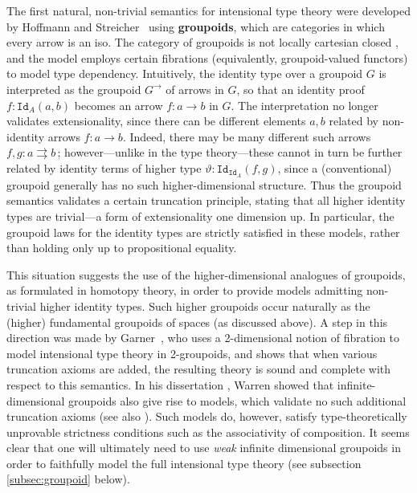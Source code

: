 \documentclass[reqno,12pt]{amsart}
\newcommand{\myemph}[1]{\textbf{#1}}    %
\newcommand{\id}[1]{\texttt{Id}_{#1}}
\theoremstyle{definition}
\theoremstyle{remark}
\begin{document}
The first natural, non-trivial semantics for intensional type theory were developed by Hoffmann and Streicher~\cite{Hofmann:GITT} using \myemph{groupoids}, which are categories in which every arrow is an iso.   The category of groupoids is not locally cartesian closed \cite{Palmgren:GLCC}, and the model employs certain fibrations (equivalently, groupoid-valued functors) to model type dependency.  Intuitively, the identity type over a groupoid $G$ is interpreted as the groupoid $G^{\rightarrow}$ of arrows in $G$, so that an identity proof $f:\id{A}(a,b)$\/ becomes an arrow $f:a\rightarrow b$ in $G$.  The interpretation no longer validates extensionality, since there can be different elements $a, b$ related by non-identity arrows $f:a\rightarrow b$.  Indeed, there may be many different such arrows $f,g: a\rightrightarrows b$\,; however---unlike in the type theory---these cannot in turn be further related by identity terms of higher type $\vartheta:\id{\id{A}}(f,g)$, since a (conventional) groupoid generally has no such higher-dimensional structure.  Thus the groupoid semantics validates a certain truncation principle, stating that all higher identity types are trivial---a form of extensionality one dimension up. In particular, the groupoid laws for the identity types are strictly satisfied in these models, rather than holding only up to propositional equality.

This situation suggests the use of the higher-dimensional analogues of groupoids, as formulated in homotopy theory, in order to provide models admitting non-trivial higher identity types.   Such higher groupoids occur naturally as the (higher) fundamental groupoids of spaces (as discussed above).   A step in this direction was made by Garner~\cite{Garner:TDMTT}, who uses a 2-dimensional notion of fibration to model intensional type theory in 2-groupoids, and shows that when various truncation axioms are added, the resulting theory is sound and complete with respect to this semantics.  In his dissertation \cite{Warren:PhD}, Warren showed that infinite-dimensional groupoids also give rise to models, which validate no such additional truncation axioms (see also \cite{Warren:OG}).  Such models do, however, satisfy type-theoretically unprovable strictness conditions such as the associativity of composition.  It seems clear that one will ultimately need to use \emph{weak} infinite dimensional groupoids in order to faithfully model the full intensional type theory (see subsection \ref{subsec:groupoid} below).


\end{document}
